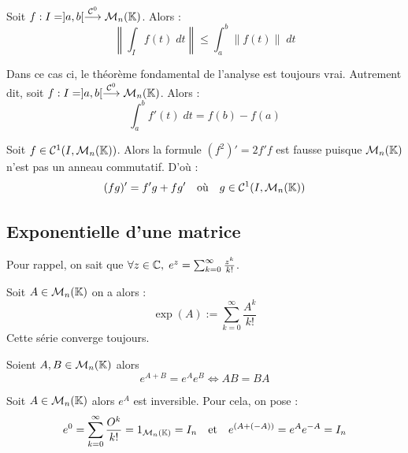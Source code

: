 \begin{proposition}
    Soit $f : I = ]a,b[ \overset{ \mathcal{C}^0}{\longrightarrow} \mathcal{M}_n(\mathbb{K})$. Alors :
        \[ \left\| \int_I f(t) \; dt \right\| \leqslant \int_{a}^{b} \left\| f(t) \right\| \; dt \] 
\end{proposition}

\begin{prop}
    Dans ce cas ci, le théorème fondamental de l'analyse est toujours vrai. 
    Autrement dit, soit $f : I = ]a,b[ \overset{ \mathcal{C}^0}{\longrightarrow} \mathcal{M}_n(\mathbb{K})$. 
    Alors : 
        \[ \int_{a}^{b} f'(t) \; dt = f(b) - f(a) \] 
\end{prop}

\begin{remark}
    Soit $f \in \mathcal{C}^1(I, \mathcal{M}_n(\mathbb{K}))$. Alors la formule $(f^2)' = 2f'f$ est fausse 
    puisque $\mathcal{M}_n(\mathbb{K})$ n'est pas un anneau commutatif. D'où : 
        \[ (fg)' = f'g + fg' \quad \text{où} \quad g \in \mathcal{C}^1(I, \mathcal{M}_n(\mathbb{K})) \] 
\end{remark}

\subsection{Exponentielle d'une matrice}

\begin{remark}
    Pour rappel, on sait que $ \forall z \in \mathbb{C}, \; e^z = \sum_{k=0}^{\infty} \frac{z^k}{k!}$. 
\end{remark}

\begin{definition}
    Soit $A \in \mathcal{M}_n(\mathbb{K})$ on a alors :
        \[ \exp(A) := \sum_{k=0}^{\infty} \frac{A^k}{k!} \]
    Cette série converge toujours. 
\end{definition}

\begin{proposition}
    Soient $A,B \in \mathcal{M}_n(\mathbb{K})$ alors 
        \[ e^{A+B} = e^A e^B \iff AB = BA \] 
\end{proposition}

\begin{proposition}[Inverse]
    Soit $A \in \mathcal{M}_n(\mathbb{K})$ alors $e^A$ est inversible. 
    Pour cela, on pose :
    \[ e^0 = \sum_{k=0}^{\infty} \frac{O^k}{k!} = 1_{\mathcal{M}_n(\mathbb{K})} = I_n \quad \text{et} \quad e^{(A+ (-A))} = e^A e^{-A} = I_n \] 
\end{proposition}

